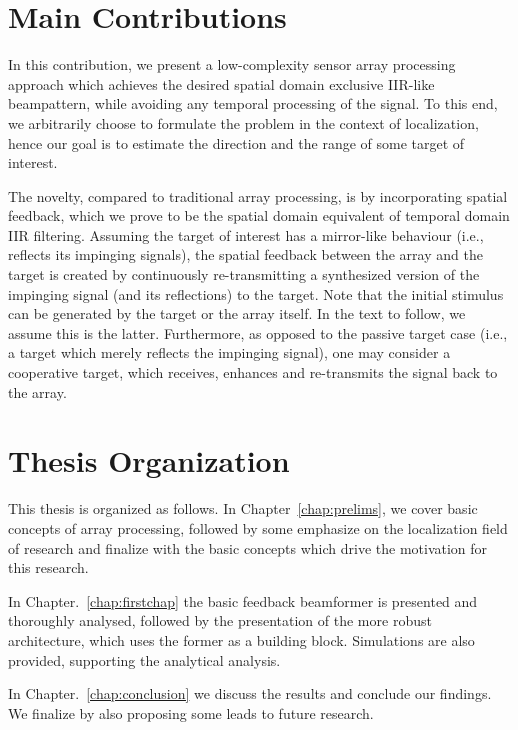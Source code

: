 \section{Main Contributions}
\par In this contribution, we present a low-complexity sensor array processing approach which achieves the desired spatial domain exclusive IIR-like beampattern, while avoiding any temporal processing of the signal.
To this end, we arbitrarily choose to formulate the problem in the context of localization, hence our goal is to estimate the direction and the range of some target of interest. 
\par The novelty, compared to traditional array processing, is by incorporating spatial feedback, which we prove to be the spatial domain equivalent of temporal domain IIR filtering.
Assuming the target of interest has a mirror-like behaviour (i.e., reflects its impinging signals), the spatial feedback between the array and the target is created by continuously re-transmitting a synthesized version of the impinging signal (and its reflections) to the target.
Note that the initial stimulus can be generated by the target or the array itself. In the text to follow, we assume this is the latter. 
Furthermore, as opposed to the passive target case (i.e., a target which merely reflects the impinging signal), one may consider a cooperative target, which receives, enhances and re-transmits the signal back to the array.
\section{Thesis Organization}
\par This thesis is organized as follows.
In Chapter~\ref{chap:prelims}, we cover basic concepts of array processing, followed by some emphasize on the localization field of research and finalize with the basic concepts which drive the motivation for this research.
\par In Chapter.~\ref{chap:firstchap} the basic feedback beamformer is presented and thoroughly analysed, followed by the presentation of the more robust architecture, which uses the former as a building block.
Simulations are also provided, supporting the analytical analysis.
\par In Chapter.~\ref{chap:conclusion} we discuss the results and conclude our findings. We finalize by also proposing some leads to future research.